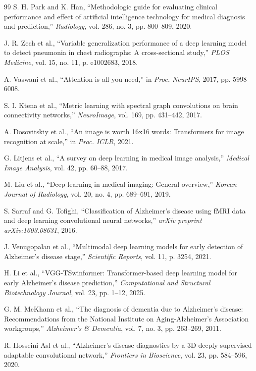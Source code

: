 \documentclass[conference]{IEEEtran}
\begin{document}
\begin{thebibliography}{99}
S. H. Park and K. Han, ``Methodologic guide for evaluating clinical performance and effect of artificial intelligence technology for medical diagnosis and prediction,'' \textit{Radiology}, vol. 286, no. 3, pp. 800--809, 2020.

J. R. Zech et al., ``Variable generalization performance of a deep learning model to detect pneumonia in chest radiographs: A cross-sectional study,'' \textit{PLOS Medicine}, vol. 15, no. 11, p. e1002683, 2018.

A. Vaswani et al., ``Attention is all you need,'' in \textit{Proc. NeurIPS}, 2017, pp. 5998--6008.

S. I. Ktena et al., ``Metric learning with spectral graph convolutions on brain connectivity networks,'' \textit{NeuroImage}, vol. 169, pp. 431--442, 2017.

A. Dosovitskiy et al., ``An image is worth 16x16 words: Transformers for image recognition at scale,'' in \textit{Proc. ICLR}, 2021.

G. Litjens et al., ``A survey on deep learning in medical image analysis,'' \textit{Medical Image Analysis}, vol. 42, pp. 60--88, 2017.

M. Liu et al., ``Deep learning in medical imaging: General overview,'' \textit{Korean Journal of Radiology}, vol. 20, no. 4, pp. 689--691, 2019.

S. Sarraf and G. Tofighi, ``Classification of Alzheimer's disease using fMRI data and deep learning convolutional neural networks,'' \textit{arXiv preprint arXiv:1603.08631}, 2016.

J. Venugopalan et al., ``Multimodal deep learning models for early detection of Alzheimer's disease stage,'' \textit{Scientific Reports}, vol. 11, p. 3254, 2021.

H. Li et al., ``VGG-TSwinformer: Transformer-based deep learning model for early Alzheimer's disease prediction,'' \textit{Computational and Structural Biotechnology Journal}, vol. 23, pp. 1--12, 2025.

G. M. McKhann et al., ``The diagnosis of dementia due to Alzheimer's disease: Recommendations from the National Institute on Aging-Alzheimer's Association workgroups,'' \textit{Alzheimer's \& Dementia}, vol. 7, no. 3, pp. 263--269, 2011.

R. Hosseini-Asl et al., ``Alzheimer's disease diagnostics by a 3D deeply supervised adaptable convolutional network,'' \textit{Frontiers in Bioscience}, vol. 23, pp. 584--596, 2020.


\end{thebibliography}
\end{document}
